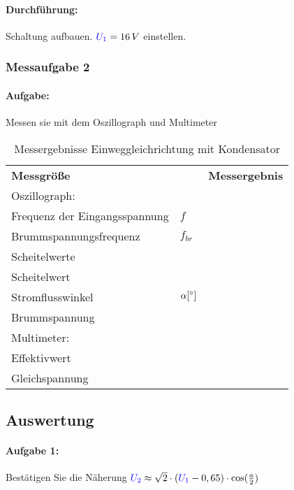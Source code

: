 \documentclass[11pt,a4paper,titlepage]{scrreprt}
\begin{document}
					\paragraph{Durchführung:} Schaltung aufbauen. $\textcolor{blue}{U_1} = 16\,V$ einstellen.\\ 		

				\subsubsection{Messaufgabe 2}
					\paragraph{Aufgabe:} Messen sie mit dem Oszillograph und Multimeter
					\begin{table}[!hbtp]
						\caption{Messergebnisse Einweggleichrichtung mit Kondensator}
						\label{tbl:messergebnisse1.2}
						\renewcommand{\arraystretch}{1.3}
						\begin{tabular}{ll|l}
							\multicolumn{2}{l}{\textbf{Messgröße}} & \textbf{Messergebnis}\\
                                                        \multicolumn{3}{l}{Oszillograph:}\\\hline
							Frequenz der Eingangsspannung & $f$ & \\
							Brummspannungsfrequenz & $f_{br}$ &\\
							Scheitelwerte & \spannung{$U_{1_{max}}$} &\\
							Scheitelwert & \spannung{$U_{2_{max}}$} &\\
							Stromflusswinkel &  $\alpha [ \degree]$&\\
							Brummspannung &  \spannung{$U_{brmax}$} &\\
                            \multicolumn{3}{l}{Multimeter:}\\\hline
							Effektivwert & \spannung{$U_{1}$} &\\
							Gleichspannung & \spannung{$U_{2-}$} &\\
						\end{tabular}
					\end{table}
			\subsection{Auswertung}
				\paragraph{Aufgabe 1:} Bestätigen Sie die Näherung $\textcolor{blue}{U_2} \approx  \sqrt{2} \cdot (\textcolor{blue}{U_1} - 0,65) \cdot \cos(\frac{a}{2})$				
				
\end{document}
